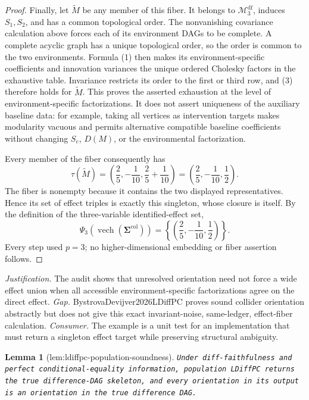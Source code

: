 \documentclass{article}
\newtheorem{lemma}{Lemma}
\begin{document}
\begin{proof}
Finally, let \(\widetilde M\) be any member of this fiber. It belongs to \(\mathcal M_3^{\mathrm{df}}\), induces \(S_1,S_2\), and has a common topological order. The nonvanishing covariance calculation above forces each of its environment DAGs to be complete. A complete acyclic graph has a unique topological order, so the order is common to the two environments. Formula (1) then makes its environment-specific coefficients and innovation variances the unique ordered Cholesky factors in the exhaustive table. Invariance restricts its order to the first or third row, and (3) therefore holds for \(\widetilde M\). This proves the asserted exhaustion at the level of environment-specific factorizations. It does not assert uniqueness of the auxiliary baseline data: for example, taking all vertices as intervention targets makes modularity vacuous and permits alternative compatible baseline coefficients without changing \(S_e\), \(D(M)\), or the environmental factorization.

Every member of the fiber consequently has
\[
 \tau(\widetilde M)
 =\left(\frac25,-\frac1{10},\frac25+\frac1{10}\right)
 =\left(\frac25,-\frac1{10},\frac12\right).
\]
The fiber is nonempty because it contains the two displayed representatives. Hence its set of effect triples is exactly this singleton, whose closure is itself. By the definition of the three-variable identified-effect set,
\[
 \Psi_3(\operatorname{vech}(\boldsymbol\Sigma^{\mathrm{col}}))
 =\left\{\left(\frac25,-\frac1{10},\frac12\right)\right\}.
\]
Every step used \(p=3\); no higher-dimensional embedding or fiber assertion follows.
\end{proof}
\par\smallskip\noindent \textit{Justification.} The audit shows that unresolved orientation need not force a wide effect union when all accessible environment-specific factorizations agree on the direct effect. \textit{Gap.} BystrovaDevijver2026LDiffPC proves sound collider orientation abstractly but does not give this exact invariant-noise, same-ledger, effect-fiber calculation. \textit{Consumer.} The example is a unit test for an implementation that must return a singleton effect target while preserving structural ambiguity.

\begin{lemma}[lem:ldiffpc-population-soundness]\label{lem:ldiffpc-population-soundness}
\texttt{Under diff-\allowbreak{}faithfulness and perfect conditional-\allowbreak{}equality information,\allowbreak{} population LDiffPC returns the true difference-\allowbreak{}DAG skeleton,\allowbreak{} and every orientation in its output is an orientation in the true difference DAG.}
\end{lemma}
\end{document}
